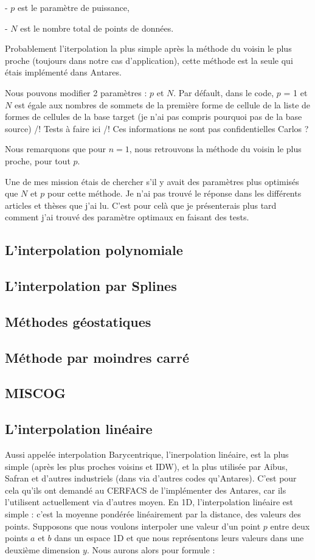 - \(p\) est le paramètre de puissance,

- \(N\) est le nombre total de points de données.



Probablement l'iterpolation la plus simple après la méthode du voisin le plus proche (toujours dans notre cas d'application), cette méthode est la seule qui étais implémenté dans Antares.

Nous pouvons modifier 2 paramètres : \(p\) et \(N\).
Par défault, dans le code, \(p\) = 1 et \(N\) est égale aux nombres de sommets de la première forme de cellule de la liste de formes de cellules de la base target (je n'ai pas compris pourquoi pas de la base source) /! Tests à faire ici /!
Ces informations ne sont pas confidentielles Carlos ?

Nous remarquons que pour \( n = 1 \), nous retrouvons la méthode du voisin le plus proche, pour tout \( p \).

Une de mes mission étais de chercher s'il y avait des paramètres plus optimisés que \(N\) et \(p\) pour cette méthode. Je n'ai pas trouvé le réponse dans les différents articles et thèses que j'ai lu. C'est pour celà que je présenterais plus tard comment j'ai trouvé des paramètre optimaux en faisant des tests.


\subsection{L'interpolation polynomiale}
\subsection{L'interpolation par Splines}
\subsection{Méthodes géostatiques}
\subsection{Méthode par moindres carré}
\subsection{MISCOG}

\subsection{L'interpolation linéaire}
Aussi appelée interpolation Barycentrique, l'inerpolation linéaire, est la plus simple (après les plus proches voisins et IDW), et la plus utilisée par Aibus, Safran et d'autres industriels (dans via d'autres codes qu'Antares).
C'est pour cela qu'ils ont demandé au CERFACS de l'implémenter des Antares, car ils l'utilisent actuellement via d'autres moyen.
En 1D, l'interpolation linéaire est simple : c'est la moyenne pondérée linéairement par la distance, des valeurs des points.
Supposons que nous voulons interpoler une valeur d'un point \( p \) entre deux points \( a \) et \( b \) dans un espace 1D
et que nous représentons leurs valeurs dans une deuxième dimension \( y \).
Nous aurons alors pour formule :

